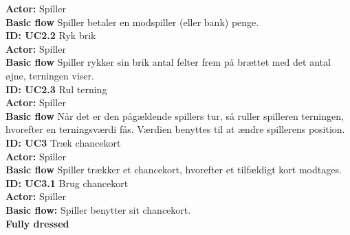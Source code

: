 \textbf{Actor: } Spiller \\
\textbf{Basic flow} Spiller betaler en modspiller (eller bank) penge. \\
\newline
\textbf{ID: UC2.2} Ryk brik \\
\textbf{Actor: } Spiller \\
\textbf{Basic flow} Spiller rykker sin brik antal felter frem på brættet med det antal øjne, terningen viser. \\
\newline
\textbf{ID: UC2.3} Rul terning \\
\textbf{Actor: } Spiller \\
\textbf{Basic flow} Når det er den pågældende spillers tur, så ruller spilleren terningen, hvorefter en terningsværdi fås. Værdien benyttes til at ændre spillerens position. \\
\newline
\textbf{ID: UC3} Træk chancekort \\
\textbf{Actor: } Spiller \\
\textbf{Basic flow} Spiller trækker et chancekort, hvorefter et tilfældigt kort modtages. \\
\newline
\textbf{ID: UC3.1} Brug chancekort \\
\textbf{Actor: } Spiller \\
\textbf{Basic flow: } Spiller benytter sit chancekort. \\
\newline
\textbf{Fully dressed}
